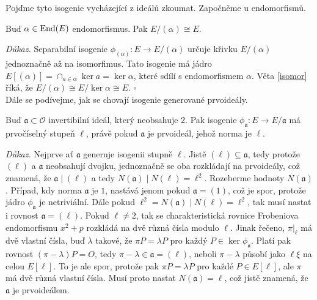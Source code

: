 \documentclass[12pt]{report}
\begin{document}
Pojďme tyto isogenie vycházející z ideálů zkoumat. Započněme u endomorfismů.
\begin{lemma}\label{endo}
Buď $\alpha \in \operatorname{End}(E)$ endomorfismus. Pak $E/(\alpha) \cong E$.
\end{lemma}
\noindent \textit{Důkaz.} Separabilní isogenie $\phi_{(\alpha)} : E \longrightarrow E/(\alpha)$ určuje křivku $E/(\alpha)$ jednoznačně až na isomorfimus. Tato isogenie má jádro $E[(\alpha)] = \cap_{a \in \alpha} \ker a = \ker \alpha$, které sdílí s endomorfismem $\alpha$. Věta \ref{isomor} říká, že $E/(\alpha) \cong E/\ker \alpha \cong E$. \hfill $\square$\\


Dále se podívejme, jak se chovají isogenie generované prvoideály. 

\begin{veta}\label{normm}
Buď $\mathfrak{a} \subset \mathcal{O}$ invertibilní ideál, který neobsahuje $2$. Pak isogenie $\phi_{\mathfrak{a}} : E \longrightarrow E/\mathfrak{a}$ má prvočíselný stupeň $\ell$, právě pokud $\mathfrak{a}$ je prvoideál, jehož norma je $\ell$.
\end{veta}
\noindent \textit{Důkaz.} Nejprve ať $\mathfrak{a}$ generuje isogenii stupně $\ell$. Jistě $(\ell) \subseteq \mathfrak{a}$, tedy protože $(\ell)$ a $\mathfrak{a}$ neobsahují dvojku, jednoznačně se oba rozkládají na prvoideály, což znamená, že $\mathfrak{a} \mid (\ell)$ a tedy $N(\mathfrak{a}) \mid N(\ell) = \ell ^2$. Rozeberme hodnoty $N(\mathfrak{a})$. Případ, kdy norma $\mathfrak{a}$ je $1$, nastává jenom pokud $\mathfrak{a} = (1)$, což je spor, protože jádro $\phi_{\mathfrak{a}}$ je netriviální. Dále pokud $ \ell^2 = N(\mathfrak{a})  \mid N(\ell) = \ell ^2$, tak musí nastat i rovnost $\mathfrak{a} = (\ell)$. Pokud $\ell \neq 2$, tak se charakteristická rovnice Frobeniova endomorfismu $x^2 + p$ rozkládá na dvě různá čísla modulo $\ell$. Jinak řečeno, $\pi \vert_{\ell}$ má dvě vlastní čísla, buď $\lambda$ takové, že $\pi P = \lambda P$ pro každý $P \in \ker \phi_{\mathfrak{a}}$. Platí pak rovnost $(\pi - \lambda) P = O$, tedy $\pi - \lambda \in \mathfrak{a} = (\ell)$, neboli $\pi - \lambda$ působí jako $\ell \xi$ na celou $E[\ell]$. To je ale spor, protože pak $\pi P = \lambda P$ pro každé $P \in E[\ell]$, ale $\pi$ má dvě různá vlastní čísla. Musí proto nastat $N(\mathfrak{a}) = \ell$, což jistě znamená, že $\mathfrak{a}$ je prvoideálem.
\end{document}

